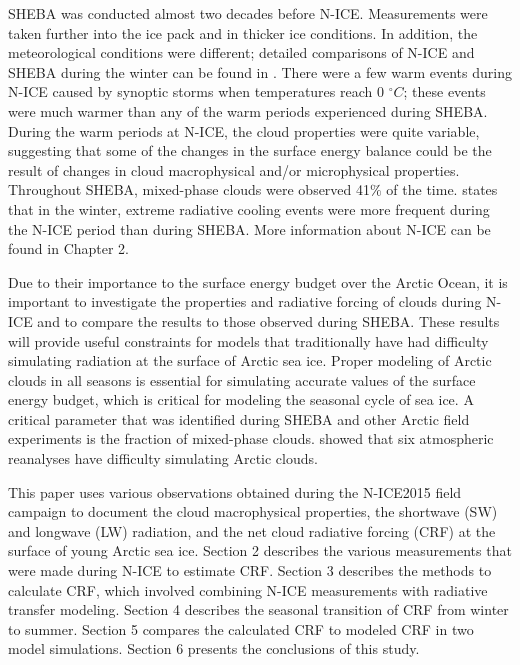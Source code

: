 SHEBA was conducted almost two decades before N-ICE. Measurements were taken further into the ice pack \citep{cohen:2017} and in thicker ice conditions. In addition, the meteorological conditions were different; detailed comparisons of N-ICE and SHEBA during the winter can be found in \citep{graham:2017:comp}. There were a few warm events during N-ICE caused by synoptic storms when temperatures reach 0 $^{\circ}C$; these events were much warmer than any of the warm periods experienced during SHEBA.  During the warm periods at N-ICE, the cloud properties were quite variable, suggesting that some of the changes in the surface energy balance could be the result of changes in cloud macrophysical and/or microphysical properties. Throughout SHEBA, mixed-phase clouds were observed 41$\%$ of the time. \citet{graham:2017:comp} states that in the winter, extreme radiative cooling events were more frequent during the N-ICE period than during SHEBA. More information about N-ICE can be found in Chapter 2.

Due to their importance to the surface energy budget over the Arctic Ocean, it is important to investigate the properties and radiative forcing of clouds during N-ICE and to compare the results to those observed during SHEBA. These results will provide useful constraints for models that traditionally have had difficulty simulating radiation at the surface of Arctic sea ice. Proper modeling of Arctic clouds in all seasons is essential for simulating accurate values of the surface energy budget, which is critical for modeling the seasonal cycle of sea ice. A critical parameter that was identified during SHEBA \citep{inoue:2008, tjernstrom:2005} and other Arctic field experiments \citep{hines:2017, listowski:2017, hines:2019} is the fraction of mixed-phase clouds. \citet{graham:2019} showed that six atmospheric reanalyses have difficulty simulating Arctic clouds.

This paper uses various observations obtained during the N-ICE2015 field campaign to document the cloud macrophysical properties, the shortwave (SW) and longwave (LW) radiation, and the net cloud radiative forcing (CRF) at the surface of young Arctic sea ice. Section 2 describes the various measurements that were made during N-ICE to estimate CRF. Section 3 describes the methods to calculate CRF, which involved combining N-ICE measurements with radiative transfer modeling. Section 4 describes the seasonal transition of CRF from winter to summer. Section 5 compares the calculated CRF to modeled CRF in two model simulations. Section 6 presents the conclusions of this study.

